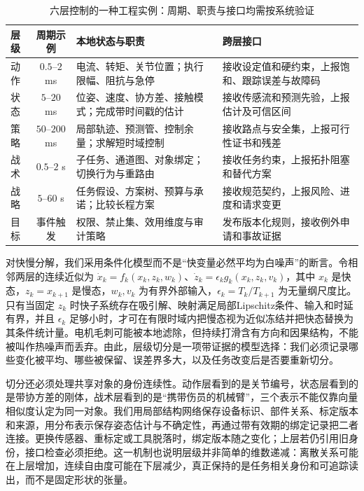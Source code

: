 \begin{table}[htbp]
\centering
\footnotesize
\renewcommand{\arraystretch}{1.25}
\begin{tabularx}{\textwidth}{l|c|X|X}
\toprule
\rowcolor{structurecolor!20}\textbf{层级} & \textbf{周期示例} & \textbf{本地状态与职责} & \textbf{跨层接口}\\
\midrule
动作 & $0.5$--$2$ ms & 电流、转矩、关节位置；执行限幅、阻抗与急停 & 接收设定值和硬约束，上报饱和、跟踪误差与故障码\\
状态 & $5$--$20$ ms & 位姿、速度、协方差、接触模式；完成带时间戳的估计 & 接收传感流和预测先验，上报估计及可信区间\\
策略 & $50$--$200$ ms & 局部轨迹、预测管、控制余量；求解短时域控制 & 接收路点与安全集，上报可行性证书和残差\\
战术 & $0.5$--$2$ s & 子任务、通道图、对象绑定；切换行为与重路由 & 接收任务约束，上报拓扑阻塞和替代方案\\
战略 & $5$--$60$ s & 任务假设、方案树、预算与承诺；比较长程方案 & 接收规范契约，上报风险、进度和请求变更\\
目标 & 事件触发 & 权限、禁止集、效用维度与审计策略 & 发布版本化规则，接收例外申请和事故证据\\
\bottomrule
\end{tabularx}
\caption{六层控制的一种工程实例：周期、职责与接口均需按系统验证}
\label{tab:six_level_hierarchy}
\end{table}

对快慢分解，我们采用条件化模型而不是“快变量必然平均为白噪声”的断言。令相邻两层的连续近似为 $\dot x_k=f_k(x_k,z_k,w_k)$、$\dot z_k=\epsilon_k g_k(x_k,z_k,v_k)$，其中 $x_k$ 是快态，$z_k=x_{k+1}$ 是慢态，$w_k,v_k$ 为有界外部输入，$\epsilon_k=T_k/T_{k+1}$ 为无量纲尺度比。只有当固定 $z_k$ 时快子系统存在吸引解、映射满足局部Lipschitz条件、输入和时延有界，并且 $\epsilon_k$ 足够小时，才可在有限时域内把慢态视为近似冻结并把快态替换为其条件统计量。电机毛刺可能被本地滤除，但持续打滑含有方向和因果结构，不能被叫作热噪声而丢弃。由此，层级切分是一项带证据的模型选择：我们必须记录哪些变化被平均、哪些被保留、误差界多大，以及任务改变后是否要重新切分。

切分还必须处理共享对象的身份连续性。动作层看到的是关节编号，状态层看到的是带协方差的刚体，战术层看到的是“携带伤员的机械臂”，三个表示不能仅靠向量相似度认定为同一对象。我们用局部结构网络保存设备标识、部件关系、标定版本和来源，用分布表示保存姿态估计与不确定性，再通过带有效期的绑定记录把二者连接。更换传感器、重标定或工具脱落时，绑定版本随之变化；上层若仍引用旧身份，接口检查必须拒绝。这一机制也说明层级并非简单的维数递减：离散关系可能在上层增加，连续自由度可能在下层减少，真正保持的是任务相关身份和可追踪读出，而不是固定形状的张量。

